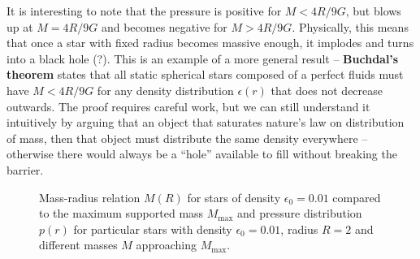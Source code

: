\documentclass[a4paper,11pt,twoside]{report}
\begin{document}
It is interesting to note that the pressure is positive for $M < 4R/9G$, but blows up at $M = 4R/9G$ and becomes negative for $M > 4R/9G$.
Physically, this means that once a star with fixed radius becomes massive enough, it implodes and turns into a black hole (?).
This is an example of a more general result -- \textbf{Buchdal's theorem} states that all static spherical stars composed of a perfect fluids must have $M < 4R/9G$ for any density distribution $\epsilon(r)$ that does not decrease outwards. \cite{ref:buchdal}
The proof requires careful work, but we can still understand it intuitively by arguing that an object that saturates nature's law on distribution of mass, then that object must distribute the same density everywhere -- otherwise there would always be a ``hole'' available to fill without breaking the barrier.

\iffalse
Let $\epsilon_0$ and $p_0$ be free variables.
Solving $p(0) = p_0$ and $M=\frac{4}{3} \pi R^3 \epsilon_0$ for $R$ and $M$, we get
\begin{equation}
	R = \sqrt{\frac{3}{4 \pi}} \sqrt{\frac{p_0}{(\epsilon_0 + 3 p_0) \epsilon_0 G}}
	\quad \text{and} \quad
	M = \frac{4}{3} \pi R^3 \epsilon_0
\end{equation}
\begin{equation}
	M(R) = -\frac{4 \pi R^3}{3} \frac{3 \sqrt{1-\frac{2GM}{R}} + 1}{\sqrt{1-\frac{2GM}{R}} + 1} p_0
\end{equation}
\fi

\begin{figure}[hb!]
\centering
{}
\caption{Mass-radius relation $M(R)$ for stars of density $\epsilon_0 = 0.01$ compared to the maximum supported mass $M_\text{max}$ and pressure distribution $p(r)$ for particular stars with density $\epsilon_0=0.01$, radius $R=2$ and different masses $M$ approaching $M_\text{max}$.}
\end{figure}
\end{document}
